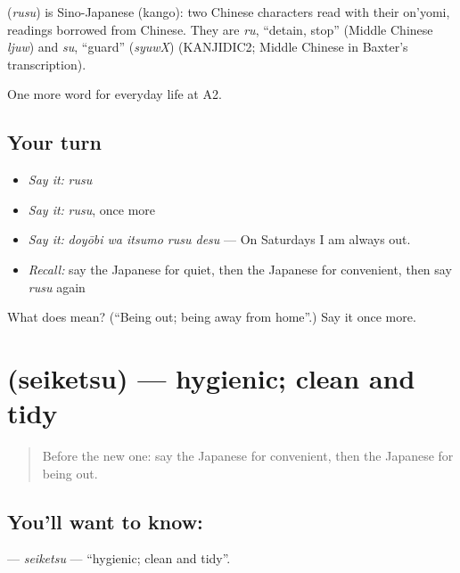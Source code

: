 \begin{cousinweb}
\textbf{} (\emph{rusu}) is Sino-Japanese (kango): two Chinese characters read with their on'yomi, readings borrowed from Chinese. They are \emph{ru}, \textquotedblleft{}detain, stop\textquotedblright{} (Middle Chinese \emph{ljuw}) and \emph{su}, \textquotedblleft{}guard\textquotedblright{} (\emph{syuwX}) (KANJIDIC2; Middle Chinese in Baxter's transcription).
\end{cousinweb}

\begin{grammarlens}[title={What you've built}]
One more word for everyday life at A2.
\end{grammarlens}

\subsection*{Your turn}
\begin{itemize}
\raggedright
  \item \emph{Say it:} \emph{rusu}
  \item \emph{Say it:} \emph{rusu}, once more
  \item \emph{Say it:} \emph{doyōbi wa itsumo rusu desu} — On Saturdays I am always out.
  \item \emph{Recall:} say the Japanese for quiet, then the Japanese for convenient, then say \emph{rusu} again
\end{itemize}

\begin{tcolorbox}[breakable,colback=teal!4,colframe=teal!35!black,title={Before you move on}]
What does  mean? (\textquotedblleft{}Being out; being away from home\textquotedblright{}.) Say it once more.
\end{tcolorbox}
\section[\texorpdfstring{\ja{せいけつ} (seiketsu)}{せいけつ (seiketsu)}]{ (seiketsu) — hygienic; clean and tidy}

\label{lesson:JA-C163-seiketsu}



\begin{quote}
Before the new one: say the Japanese for convenient, then the Japanese for being out.
\end{quote}

\subsection*{You'll want to know: }
\textbf{} — \emph{seiketsu} — \textquotedblleft{}hygienic; clean and tidy\textquotedblright{}.

